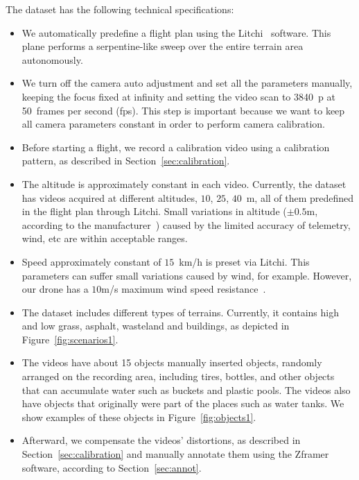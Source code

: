 The dataset has the following technical specifications:
%
\begin{itemize}
  \item We automatically predefine a flight plan using the Litchi~\cite{web:litchi} software.
  This plane performs a serpentine-like sweep over the entire terrain area autonomously.
%
  \item We turn off the camera auto adjustment and set all the parameters manually,
  keeping the focus fixed at infinity and
  setting the video scan to 3840~p at 50~frames per second (fps).
  This step is important because we want to keep all camera parameters constant in order to perform camera calibration.
%
  \item Before starting a flight, we record a calibration video using a calibration pattern, as described in Section~\ref{sec:calibration}.
%
  \item The altitude is approximately constant in each video.
  Currently, the dataset has videos acquired at different altitudes, \eg $10$, $25$, $40$~m, all of them predefined in the flight plan through Litchi.
  Small variations in altitude ($\pm 0.5$m, according to the manufacturer~\cite{web:djip4prospec}) caused by the limited accuracy of telemetry, wind, etc are within acceptable ranges.
%
  \item Speed approximately constant of $15$~km/h is preset via Litchi.
  This parameters can suffer small variations caused by wind, for example.
  However, our drone has a $10$m/s maximum wind speed resistance~\cite{web:djip4prospec}.
%
  \item The dataset includes different types of terrains.
  Currently, it contains high and low grass, asphalt, wasteland and buildings, as depicted in Figure~\ref{fig:scenarios1}.
%
  \item The videos have about 15 objects manually inserted objects, randomly arranged on the recording area, including tires, bottles, and other objects that can accumulate water such as buckets and plastic pools.
  The videos also have objects that originally were part of the places such as water tanks.
  We show examples of these objects in Figure~\ref{fig:objects1}.
%
  \item Afterward, we compensate the videos' distortions, as described in Section~\ref{sec:calibration} and manually annotate them using the Zframer software, according to Section~\ref{sec:annot}.
%
\end{itemize}

